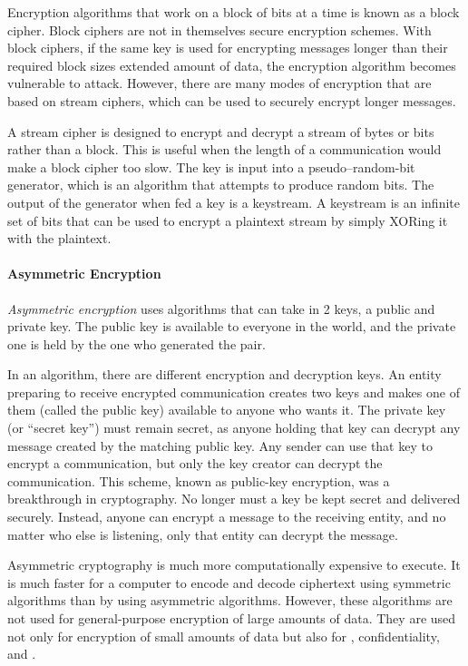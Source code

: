 Encryption algorithms that work on a block of bits at a time is known as a block cipher.
Block ciphers are not in themselves secure encryption schemes.
With block ciphers, if the same key is used for encrypting messages longer than their required block sizes extended amount of data, the encryption algorithm becomes vulnerable to attack.
However, there are many modes of encryption that are based on stream ciphers, which can be used to securely encrypt longer messages.

A stream cipher is designed to encrypt and decrypt a stream of bytes or bits rather than a block.
This is useful when the length of a communication would make a block cipher too slow.
The key is input into a pseudo–random-bit generator, which is an algorithm that attempts to produce random bits.
The output of the generator when fed a key is a keystream.
A keystream is an infinite set of bits that can be used to encrypt a plaintext stream by simply XORing it with the plaintext.

\paragraph{Asymmetric Encryption}\label{par:Asymmetric_Encryption}
\begin{definition}\label{def:Asymmetric_Encryption}
  \emph{Asymmetric encryption} uses algorithms that can take in 2 keys, a public and private key.
  The public key is available to everyone in the world, and the private one is held by the one who generated the pair.
\end{definition}
In an  algorithm, there are different encryption and decryption keys.
An entity preparing to receive encrypted communication creates two keys and makes one of them (called the public key) available to anyone who wants it.
The private key (or ``secret key'') must remain secret, as anyone holding that key can decrypt any message created by the matching public key.
Any sender can use that key to encrypt a communication, but only the key creator can decrypt the communication.
This scheme, known as public-key encryption, was a breakthrough in cryptography.
No longer must a key be kept secret and delivered securely.
Instead, anyone can encrypt a message to the receiving entity, and no matter who else is listening, only that entity can decrypt the message.

Asymmetric cryptography is much more computationally expensive to execute.
It is much faster for a computer to encode and decode ciphertext using symmetric algorithms than by using asymmetric algorithms.
However, these algorithms are not used for general-purpose encryption of large amounts of data.
They are used not only for encryption of small amounts of data but also for , confidentiality, and .

